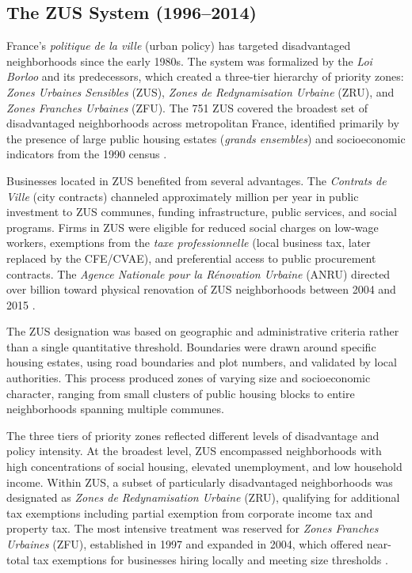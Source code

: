 \documentclass[12pt]{article}
\begin{document}
\subsection{The ZUS System (1996--2014)}

France's \textit{politique de la ville} (urban policy) has targeted disadvantaged neighborhoods since the early 1980s. The system was formalized by the \textit{Loi Borloo} and its predecessors, which created a three-tier hierarchy of priority zones: \textit{Zones Urbaines Sensibles} (ZUS), \textit{Zones de Redynamisation Urbaine} (ZRU), and \textit{Zones Franches Urbaines} (ZFU). The 751 ZUS covered the broadest set of disadvantaged neighborhoods across metropolitan France, identified primarily by the presence of large public housing estates (\textit{grands ensembles}) and socioeconomic indicators from the 1990 census \citep{monso2019pauvrete}.

Businesses located in ZUS benefited from several advantages. The \textit{Contrats de Ville} (city contracts) channeled approximately  million per year in public investment to ZUS communes, funding infrastructure, public services, and social programs. Firms in ZUS were eligible for reduced social charges on low-wage workers, exemptions from the \textit{taxe professionnelle} (local business tax, later replaced by the CFE/CVAE), and preferential access to public procurement contracts. The \textit{Agence Nationale pour la R\'enovation Urbaine} (ANRU) directed over  billion toward physical renovation of ZUS neighborhoods between 2004 and 2015 \citep{onpv2020rapport}.

The ZUS designation was based on geographic and administrative criteria rather than a single quantitative threshold. Boundaries were drawn around specific housing estates, using road boundaries and plot numbers, and validated by local authorities. This process produced zones of varying size and socioeconomic character, ranging from small clusters of public housing blocks to entire neighborhoods spanning multiple communes.

The three tiers of priority zones reflected different levels of disadvantage and policy intensity. At the broadest level, ZUS encompassed neighborhoods with high concentrations of social housing, elevated unemployment, and low household income. Within ZUS, a subset of particularly disadvantaged neighborhoods was designated as \textit{Zones de Redynamisation Urbaine} (ZRU), qualifying for additional tax exemptions including partial exemption from corporate income tax and property tax. The most intensive treatment was reserved for \textit{Zones Franches Urbaines} (ZFU), established in 1997 and expanded in 2004, which offered near-total tax exemptions for businesses hiring locally and meeting size thresholds \citep{givord2013zones}.
\end{document}
